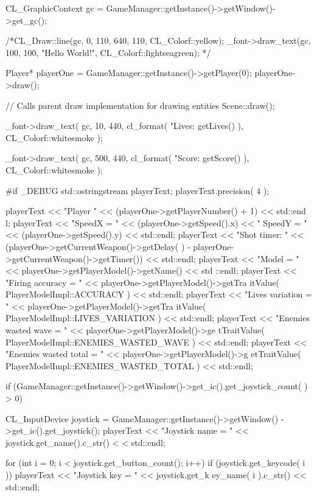 \begin{DoxyCode}
{
        CL_GraphicContext gc = GameManager::getInstance()->getWindow()->get_gc();
      

        /*CL_Draw::line(gc, 0, 110, 640, 110, CL_Colorf::yellow);
        _font->draw_text(gc, 100, 100, "Hello World!", CL_Colorf::lightseagreen);
      */

        Player* playerOne = GameManager::getInstance()->getPlayer(0);
        playerOne->draw();

        // Calls parent draw implementation for drawing entities
        Scene::draw();

        _font->draw_text( gc, 10, 440, cl_format( "Lives: %
      getLives() ), CL_Colorf::whitesmoke );

        _font->draw_text( gc, 500, 440, cl_format( "Score: %
      getScore() ), CL_Colorf::whitesmoke );

#if _DEBUG
        std::ostringstream playerText;
        playerText.precision( 4 );

        playerText << "Player " << (playerOne->getPlayerNumber() + 1) << std::end
      l;
        playerText << "SpeedX = " << (playerOne->getSpeed().x) << " SpeedY = " <<
       (playerOne->getSpeed().y) << std::endl;
        playerText << "Shot timer: " << (playerOne->getCurrentWeapon()->getDelay(
      ) - playerOne->getCurrentWeapon()->getTimer()) << std::endl;
        playerText << "Model = " << playerOne->getPlayerModel()->getName() << std
      ::endl;
        playerText << "Firing accuracy = " << playerOne->getPlayerModel()->getTra
      itValue( PlayerModelImpl::ACCURACY ) << std::endl;
        playerText << "Lives variation = " << playerOne->getPlayerModel()->getTra
      itValue( PlayerModelImpl::LIVES_VARIATION ) << std::endl;
        playerText << "Enemies wasted wave = " << playerOne->getPlayerModel()->ge
      tTraitValue( PlayerModelImpl::ENEMIES_WASTED_WAVE ) << std::endl;
        playerText << "Enemies wasted total = " << playerOne->getPlayerModel()->g
      etTraitValue( PlayerModelImpl::ENEMIES_WASTED_TOTAL ) << std::endl;

        if (GameManager::getInstance()->getWindow()->get_ic().get_joystick_count(
      ) > 0)
        {
                CL_InputDevice joystick = GameManager::getInstance()->getWindow()
      ->get_ic().get_joystick();
                playerText << "Joystick name = " << joystick.get_name().c_str() <
      < std::endl;

                for (int i = 0; i < joystick.get_button_count(); i++)
                {
                        if (joystick.get_keycode( i ))
                        {
                                playerText << "Joystick key = " << joystick.get_k
      ey_name( i ).c_str() << std::endl;
                        }
                }

}}
\end{DoxyCode}
